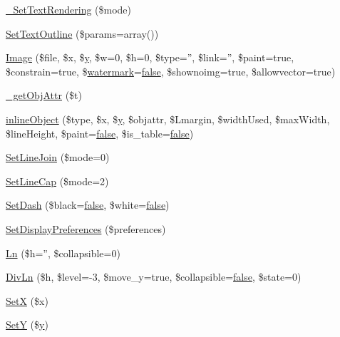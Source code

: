 \begin{DoxyCompactItemize}
\hyperlink{classm_p_d_f_a548cc5e0f92c81e4e05ca4bcabdd3c24}{\-\_\-\-Set\-Text\-Rendering} (\$mode)
\item 
\hyperlink{classm_p_d_f_a969af9794e59fd675b74df5dd42d1fef}{Set\-Text\-Outline} (\$params=array())
\item 
\hyperlink{classm_p_d_f_a415c225ad86c0e855e15a6bf4c40cc8d}{Image} (\$file, \$x, \$\hyperlink{example43___m_p_d_f_i__booklet_8php_a3f83be162d14f38451e1bc419fbbbcbc}{y}, \$w=0, \$h=0, \$type='', \$link='', \$paint=true, \$constrain=true, \$\hyperlink{classm_p_d_f_a4edd585f56deb65ec42662b866e8962d}{watermark}=\hyperlink{ttfontsuni_8php_afbaa04e5cc97693dc668b3c45d3dd740}{false}, \$shownoimg=true, \$allowvector=true)
\item 
\hyperlink{classm_p_d_f_acaf69857514d86243bfde683cdbfebff}{\-\_\-get\-Obj\-Attr} (\$t)
\item 
\hyperlink{classm_p_d_f_a20e02dcd272e6d7d8ffd9fbde395bfe6}{inline\-Object} (\$type, \$x, \$\hyperlink{example43___m_p_d_f_i__booklet_8php_a3f83be162d14f38451e1bc419fbbbcbc}{y}, \$objattr, \$Lmargin, \$width\-Used, \$max\-Width, \$line\-Height, \$paint=\hyperlink{ttfontsuni_8php_afbaa04e5cc97693dc668b3c45d3dd740}{false}, \$is\-\_\-table=\hyperlink{ttfontsuni_8php_afbaa04e5cc97693dc668b3c45d3dd740}{false})
\item 
\hyperlink{classm_p_d_f_a83aa0a170927e102ed03caae455258ea}{Set\-Line\-Join} (\$mode=0)
\item 
\hyperlink{classm_p_d_f_ad1fb92f011adb8f61358012bd08a21e5}{Set\-Line\-Cap} (\$mode=2)
\item 
\hyperlink{classm_p_d_f_a5c4f43b5fa05b995e5693a21757d7ef1}{Set\-Dash} (\$black=\hyperlink{ttfontsuni_8php_afbaa04e5cc97693dc668b3c45d3dd740}{false}, \$white=\hyperlink{ttfontsuni_8php_afbaa04e5cc97693dc668b3c45d3dd740}{false})
\item 
\hyperlink{classm_p_d_f_aef0723686ec073a206d38a2b585d0a27}{Set\-Display\-Preferences} (\$preferences)
\item 
\hyperlink{classm_p_d_f_ae2244290c625caef08a47f061b353426}{Ln} (\$h='', \$collapsible=0)
\item 
\hyperlink{classm_p_d_f_aff812e212cabe91e4029328947221cff}{Div\-Ln} (\$h, \$level=-\/3, \$move\-\_\-y=true, \$collapsible=\hyperlink{ttfontsuni_8php_afbaa04e5cc97693dc668b3c45d3dd740}{false}, \$state=0)
\item 
\hyperlink{classm_p_d_f_a801b4e0ca7ba48a46e838dcfb7050339}{Set\-X} (\$x)
\item 
\hyperlink{classm_p_d_f_a1864297a90a0350aca420871c9fb89bc}{Set\-Y} (\$\hyperlink{example43___m_p_d_f_i__booklet_8php_a3f83be162d14f38451e1bc419fbbbcbc}{y})

\end{DoxyCompactItemize}
